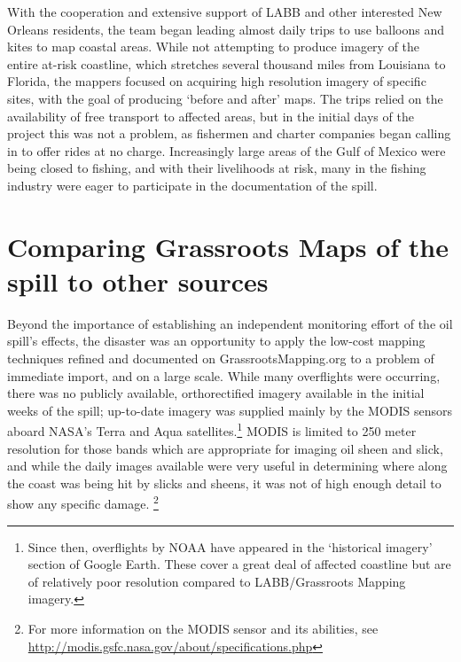 \documentclass[11pt,oneside,notitlepage]{report}
\begin{document}
With the cooperation and extensive support of \ac{LABB} and other interested New Orleans residents, the team began leading almost daily trips to use balloons and kites to map coastal areas. While not attempting to produce imagery of the entire at-risk coastline, which stretches several thousand miles from Louisiana to Florida, the mappers focused on acquiring high resolution imagery of specific sites, with the goal of producing `before and after' maps. The trips relied on the availability of free transport to affected areas, but in the initial days of the project this was not a problem, as fishermen and charter companies began calling in to offer rides at no charge. Increasingly large areas of the Gulf of Mexico were being closed to fishing, and with their livelihoods at risk, many in the fishing industry were eager to participate in the documentation of the spill. \cite{noaa2010oil}

\section{Comparing Grassroots Maps of the spill to other sources}

Beyond the importance of establishing an independent monitoring effort of the oil spill's effects, the disaster was an opportunity to apply the low-cost mapping techniques refined and documented on GrassrootsMapping.org to a problem of immediate import, and on a large scale. While many overflights were occurring, there was no publicly available, orthorectified imagery available in the initial weeks of the spill; up-to-date imagery was supplied mainly by the \ac{MODIS} sensors aboard NASA's Terra and Aqua satellites.\footnote{Since then, overflights by \ac{NOAA} have appeared in the `historical imagery' section of Google Earth. These cover a great deal of affected coastline but are of relatively poor resolution compared to \ac{LABB}/Grassroots Mapping imagery.} MODIS is limited to 250 meter resolution for those bands which are appropriate for imaging oil sheen and slick, and while the daily images available were very useful in determining where along the coast was being hit by slicks and sheens, it was not of high enough detail to show any specific damage. \cite{lotliker2009modis}\footnote{For more information on the \ac{MODIS} sensor and its abilities, see \url{http://modis.gsfc.nasa.gov/about/specifications.php}}
\end{document}
